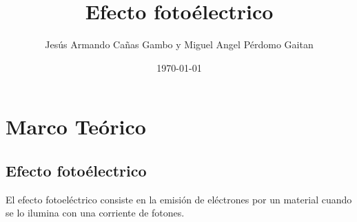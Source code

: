 \documentclass[twocolumn]{article}
\begin{document}
\author{Jesús Armando Cañas Gambo y Miguel Angel Pérdomo Gaitan}
\date{\today}
\title{Efecto fotoélectrico}
\maketitle
\section{Marco Teórico}

\subsection{Efecto fotoélectrico}

El efecto fotoeléctrico consiste en la emisión de eléctrones por un material cuando se lo ilumina con una corriente de fotones.
\end{document}
